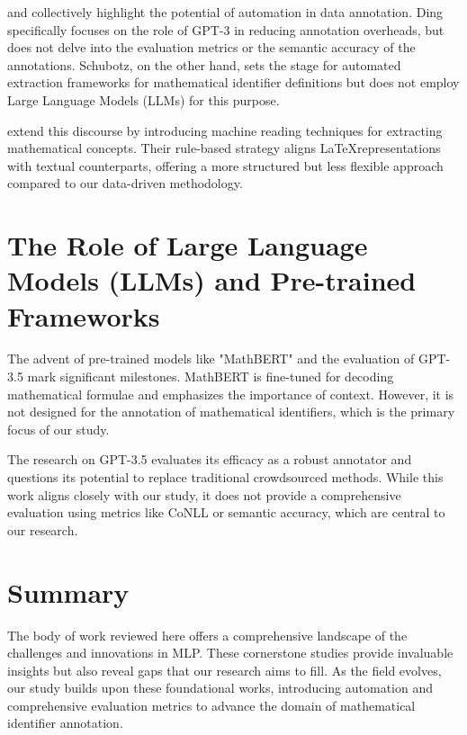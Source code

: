 \citet{ding2022gpt} and \citet{schubotz2017evaluating} collectively highlight the potential of automation in data annotation. Ding specifically focuses on the role of GPT-3 in reducing annotation overheads, but does not delve into the evaluation metrics or the semantic accuracy of the annotations. Schubotz, on the other hand, sets the stage for automated extraction frameworks for mathematical identifier definitions but does not employ Large Language Models (LLMs) for this purpose.

\citet{alexeeva2020mathalign} extend this discourse by introducing machine reading techniques for extracting mathematical concepts. Their rule-based strategy aligns \LaTeX \space representations with textual counterparts, offering a more structured but less flexible approach compared to our data-driven methodology.

\section{The Role of Large Language Models (LLMs) and Pre-trained Frameworks}

The advent of pre-trained models like "MathBERT" \citep{peng2021mathbert} and the evaluation of GPT-3.5 \citep{he2023annollm} mark significant milestones. MathBERT is fine-tuned for decoding mathematical formulae and emphasizes the importance of context. However, it is not designed for the annotation of mathematical identifiers, which is the primary focus of our study.

The research on GPT-3.5 evaluates its efficacy as a robust annotator and questions its potential to replace traditional crowdsourced methods. While this work aligns closely with our study, it does not provide a comprehensive evaluation using metrics like CoNLL or semantic accuracy, which are central to our research.

\section{Summary}

The body of work reviewed here offers a comprehensive landscape of the challenges and innovations in MLP. These cornerstone studies provide invaluable insights but also reveal gaps that our research aims to fill. As the field evolves, our study builds upon these foundational works, introducing automation and comprehensive evaluation metrics to advance the domain of mathematical identifier annotation.
